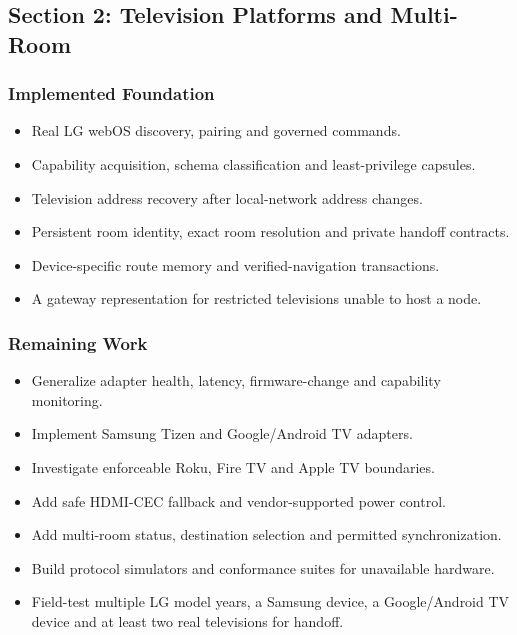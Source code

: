 \subsection{Section 2: Television Platforms and Multi-Room}

\subsubsection{Implemented Foundation}

\begin{itemize}
  \item Real LG webOS discovery, pairing and governed commands.
  \item Capability acquisition, schema classification and least-privilege capsules.
  \item Television address recovery after local-network address changes.
  \item Persistent room identity, exact room resolution and private handoff contracts.
  \item Device-specific route memory and verified-navigation transactions.
  \item A gateway representation for restricted televisions unable to host a node.
\end{itemize}

\subsubsection{Remaining Work}

\begin{itemize}
  \item Generalize adapter health, latency, firmware-change and capability monitoring.
  \item Implement Samsung Tizen and Google/Android TV adapters.
  \item Investigate enforceable Roku, Fire TV and Apple TV boundaries.
  \item Add safe HDMI-CEC fallback and vendor-supported power control.
  \item Add multi-room status, destination selection and permitted synchronization.
  \item Build protocol simulators and conformance suites for unavailable hardware.
  \item Field-test multiple LG model years, a Samsung device, a Google/Android TV
        device and at least two real televisions for handoff.
\end{itemize}

